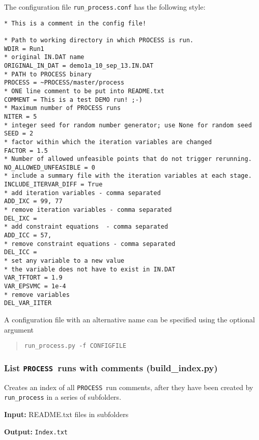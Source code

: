 \documentclass[11pt,a4paper]{article}
\newcommand{\process}{\mbox{\texttt{PROCESS}}}
\begin{document}
The configuration file \texttt{run\_process.conf} has the following style:
\begin{framed}
\begin{verbatim}
* This is a comment in the config file!

* Path to working directory in which PROCESS is run.
WDIR = Run1
* original IN.DAT name
ORIGINAL_IN_DAT = demo1a_10_sep_13.IN.DAT
* PATH to PROCESS binary
PROCESS = ~PROCESS/master/process
* ONE line comment to be put into README.txt
COMMENT = This is a test DEMO run! ;-)
* Maximum number of PROCESS runs
NITER = 5
* integer seed for random number generator; use None for random seed
SEED = 2
* factor within which the iteration variables are changed
FACTOR = 1.5
* Number of allowed unfeasible points that do not trigger rerunning.
NO_ALLOWED_UNFEASIBLE = 0
* include a summary file with the iteration variables at each stage.
INCLUDE_ITERVAR_DIFF = True
* add iteration variables - comma separated
ADD_IXC = 99, 77
* remove iteration variables - comma separated
DEL_IXC =
* add constraint equations  - comma separated
ADD_ICC = 57,
* remove constraint equations - comma separated
DEL_ICC =
* set any variable to a new value
* the variable does not have to exist in IN.DAT
VAR_TFTORT = 1.9
VAR_EPSVMC = 1e-4
* remove variables
DEL_VAR_IITER
\end{verbatim}
\end{framed}
A configuration file with an alternative name can be specified using the optional argument
\begin{quote}
\begin{verbatim}
run_process.py -f CONFIGFILE
\end{verbatim}
\end{quote}



\subsubsection{List \process\ runs with comments (build\_index.py)}

Creates an index of all \process\ run comments, after they have been created by \texttt{run\_process} in a series of subfolders.

\begin{description}
\item{\textbf{Input:}}
README.txt files in subfolders

\item{\textbf{Output:}}
\verb|Index.txt|
\end{description}
\end{document}
